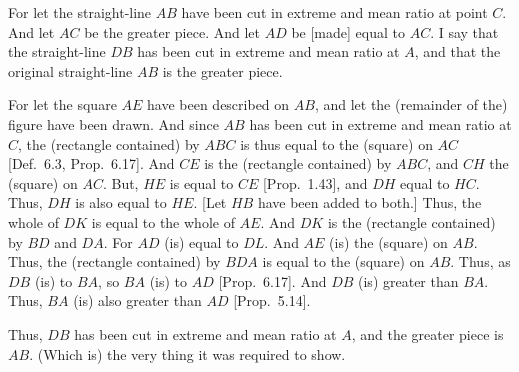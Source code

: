 \begin{Parallel}{}{}
{For let the straight-line $AB$ have been cut in extreme and mean ratio
at point $C$. And let $AC$ be the greater piece. And let $AD$
be [made] equal to $AC$. I say that the straight-line $DB$ has been cut in extreme and
mean ratio at $A$, and that the original straight-line $AB$ is
the greater piece.

For let the square $AE$ have been described on $AB$, and
let the (remainder of the) figure have been drawn. And since
$AB$ has been cut in extreme and mean ratio at $C$, the (rectangle
contained) by $ABC$ is thus equal to the (square) on $AC$
[Def.~6.3, Prop.~6.17].  And $CE$ is the (rectangle contained)
by  $ABC$,  and $CH$ the (square) on $AC$. But, $HE$ is equal
to $CE$ [Prop.~1.43], and $DH$ equal to $HC$. Thus, $DH$ is also
equal to $HE$. [Let $HB$ have been added to both.] Thus, the whole
of $DK$ is equal to the whole of $AE$. And $DK$ is the
(rectangle contained) by $BD$ and $DA$. For $AD$ (is) equal to
$DL$. And $AE$ (is) the (square) on $AB$.  Thus, the (rectangle
contained) by $BDA$ is equal to the (square) on $AB$. Thus, as
$DB$ (is) to $BA$, so $BA$ (is) to $AD$ [Prop.~6.17]. And
$DB$ (is) greater than $BA$. Thus, $BA$ (is) also greater
than $AD$ [Prop.~5.14].

Thus, $DB$ has been cut in extreme and mean ratio at $A$, and the
greater piece is $AB$. (Which is) the very thing it was required to show.}
\end{Parallel}

